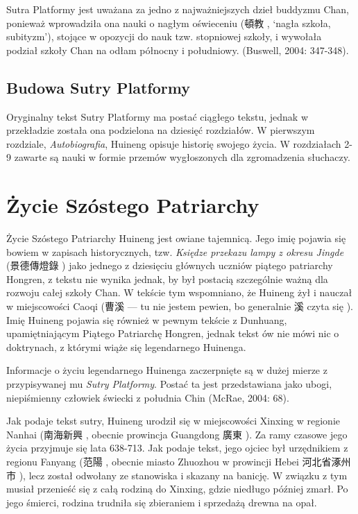 Sutra Platformy jest uważana za jedno z najważniejszych dzieł buddyzmu Chan, ponieważ wprowadziła ona nauki o nagłym oświeceniu (頓教 , `nagła szkoła, subityzm'), stojące w opozycji do nauk tzw. stopniowej szkoły, i wywołała podział szkoły Chan na odłam północny i południowy. %
(Buswell, 2004: 347-348).%

\subsection{Budowa Sutry Platformy}
Oryginalny tekst Sutry Platformy ma postać ciągłego tekstu, jednak w przekładzie została ona podzielona na dziesięć rozdziałów. W pierwszym rozdziale, \emph{Autobiografia}, Huineng opisuje historię swojego życia. W rozdziałach 2-9 zawarte są nauki w formie przemów wygłoszonych dla zgromadzenia słuchaczy. 
\fi

\section{Życie Szóstego Patriarchy}
Życie Szóstego Patriarchy Huineng jest owiane tajemnicą. Jego imię pojawia się bowiem w zapisach historycznych, tzw. \emph{Księdze przekazu lampy z okresu Jingde} (景德傳燈錄 ) jako jednego z dziesięciu głównych uczniów piątego patriarchy Hongren, z tekstu nie wynika jednak, by był postacią szczególnie ważną dla rozwoju całej szkoły Chan. W tekście tym wspomniano, że Huineng żył i nauczał w miejscowości Caoqi (曹溪  --- tu nie jestem pewien, bo generalnie 溪 czyta się ). Imię Huineng pojawia się również w pewnym tekście z Dunhuang, upamiętniającym Piątego Patriarchę Hongren, jednak tekst ów nie mówi nic o doktrynach, z którymi wiąże się legendarnego Huinenga.

Informacje o życiu legendarnego Huinenga zaczerpnięte są w dużej mierze z przypisywanej mu \emph{Sutry Platformy}. Postać ta jest przedstawiana jako ubogi, niepiśmienny człowiek świecki z południa Chin (McRae, 2004: 68).

Jak podaje tekst sutry, Huineng urodził się w miejscowości Xinxing w regionie Nanhai (南海新興 , obecnie prowincja Guangdong 廣東 ). Za ramy czasowe jego życia przyjmuje się lata 638-713.
Jak podaje tekst, jego ojciec był urzędnikiem z regionu Fanyang (范陽 , obecnie miasto Zhuozhou w prowincji Hebei 河北省涿州市 ), lecz został odwołany ze stanowiska i skazany na banicję. W związku z tym musiał przenieść się z całą rodziną do Xinxing, gdzie niedługo później zmarł. Po jego śmierci, rodzina trudniła się zbieraniem i sprzedażą drewna na opał.

